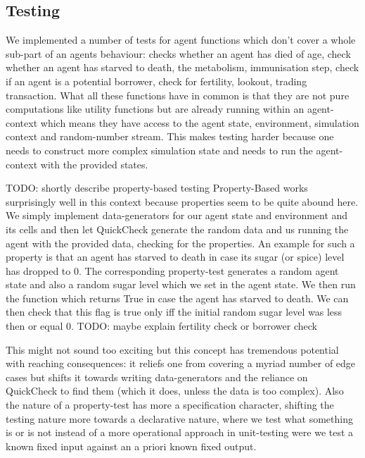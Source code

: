 \subsection{Testing}
We implemented a number of tests for agent functions which don't cover a whole sub-part of an agents behaviour: checks whether an agent has died of age, check whether an agent has starved to death, the metabolism, immunisation step, check if an agent is a potential borrower, check for fertility, lookout, trading transaction. What all these functions have in common is that they are not pure computations like utility functions but are already running within an agent-context which means they have access to the agent state, environment, simulation context and random-number stream. This makes testing harder because one needs to construct more complex simulation state and needs to run the agent-context with the provided states.

TODO: shortly describe property-based testing
Property-Based works surprisingly well in this context because properties seem to be quite abound here. We simply implement data-generators for our agent state and environment and its cells and then let QuickCheck generate the random data and us running the agent with the provided data, checking for the properties. An example for such a property is that an agent has starved to death in case its sugar (or spice) level has dropped to 0. The corresponding property-test generates a random agent state and also a random sugar level which we set in the agent state. We then run the function which returns True in case the agent has starved to death. We can then check that this flag is true only iff the initial random sugar level was less then or equal 0. TODO: maybe explain fertility check or borrower check

This might not sound too exciting but this concept has tremendous potential with reaching consequences: it reliefs one from covering a myriad number of edge cases but shifts it towards writing data-generators and the reliance on QuickCheck to find them (which it does, unless the data is too complex). Also the nature of a property-test has more a specification character, shifting the testing nature more towards a declarative nature, where we test what something is or is not instead of a more operational approach in unit-testing were we test a known fixed input against an a priori known fixed output. 

